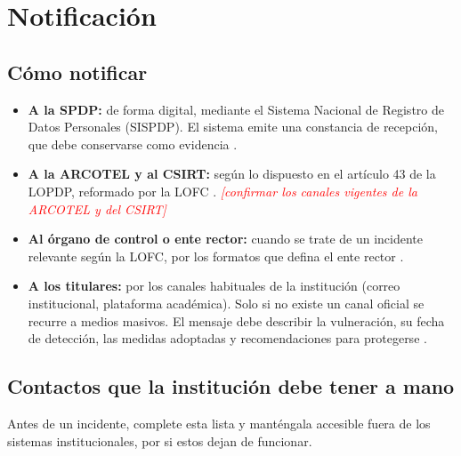 \documentclass[11pt,a4paper,oneside]{report}
\newcommand{\pendiente}[1]{\textcolor{red}{\textit{[#1]}}}
\begin{document}
\chapter{Notificación}
\label{cap:notificacion}
\section{Cómo notificar}
\begin{itemize}[leftmargin=*]
  \item \textbf{A la SPDP:} de forma digital, mediante el Sistema Nacional de Registro de Datos Personales (SISPDP). El sistema emite una constancia de recepción, que debe conservarse como evidencia \cite{spdp2026norma}.
  \item \textbf{A la ARCOTEL y al CSIRT:} según lo dispuesto en el artículo 43 de la LOPDP, reformado por la LOFC \cite{lopdp2021,lofc2026}. \pendiente{confirmar los canales vigentes de la ARCOTEL y del CSIRT}
  \item \textbf{Al órgano de control o ente rector:} cuando se trate de un incidente relevante según la LOFC, por los formatos que defina el ente rector \cite{lofc2026}.
  \item \textbf{A los titulares:} por los canales habituales de la institución (correo institucional, plataforma académica). Solo si no existe un canal oficial se recurre a medios masivos. El mensaje debe describir la vulneración, su fecha de detección, las medidas adoptadas y recomendaciones para protegerse \cite{spdp2026norma}.
\end{itemize}

\section{Contactos que la institución debe tener a mano}
Antes de un incidente, complete esta lista y manténgala accesible fuera de los sistemas institucionales, por si estos dejan de funcionar.
\end{document}
